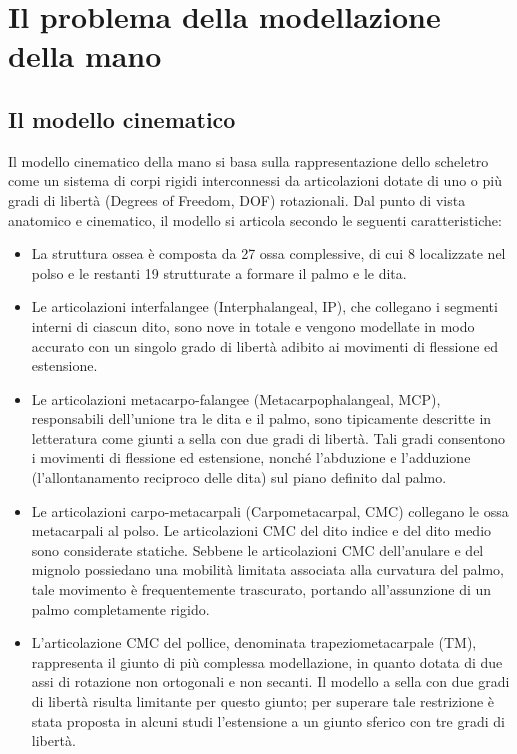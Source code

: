 \section{Il problema della modellazione della mano}


\subsection{Il modello cinematico}

Il modello cinematico della mano si basa sulla rappresentazione dello scheletro come un sistema di corpi rigidi interconnessi da articolazioni dotate di uno o più gradi di libertà (Degrees of Freedom, DOF) rotazionali.
Dal punto di vista anatomico e cinematico, il modello si articola secondo le seguenti caratteristiche:

\begin{itemize}
    \item La struttura ossea è composta da 27 ossa complessive, di cui 8 localizzate nel polso e le restanti 19 strutturate a formare il palmo e le dita.
    
    \item Le articolazioni interfalangee (Interphalangeal, IP), che collegano i segmenti interni di ciascun dito, sono nove in totale e vengono modellate in modo accurato con un singolo grado di libertà adibito ai movimenti di flessione ed estensione.
    
    \item Le articolazioni metacarpo-falangee (Metacarpophalangeal, MCP), responsabili dell'unione tra le dita e il palmo, sono tipicamente descritte in letteratura come giunti a sella con due gradi di libertà.
    Tali gradi consentono i movimenti di flessione ed estensione, nonché l'abduzione e l'adduzione (l'allontanamento reciproco delle dita) sul piano definito dal palmo.
    
    \item Le articolazioni carpo-metacarpali (Carpometacarpal, CMC) collegano le ossa metacarpali al polso.
    Le articolazioni CMC del dito indice e del dito medio sono considerate statiche. 
    Sebbene le articolazioni CMC dell'anulare e del mignolo possiedano una mobilità limitata associata alla curvatura del palmo, tale movimento è frequentemente trascurato, portando all'assunzione di un palmo completamente rigido.
    
    \item L'articolazione CMC del pollice, denominata trapeziometacarpale (TM), rappresenta il giunto di più complessa modellazione, in quanto dotata di due assi di rotazione non ortogonali e non secanti. 
    Il modello a sella con due gradi di libertà risulta limitante per questo giunto; per superare tale restrizione è stata proposta in alcuni studi l'estensione a un giunto sferico con tre gradi di libertà.
\end{itemize}

